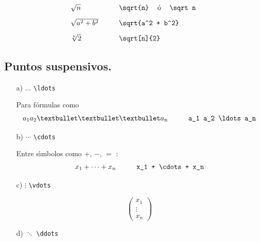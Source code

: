 $$
\begin{array}{l@{\hspace{1cm}}l}
\sqrt n & \verb+\sqrt{n}+ \mbox{\hspace{.3cm} {\'o} \hspace{.3cm}} \verb+\sqrt n+\\[.3cm]
\sqrt{a^2 + b^2} & 
\verb-\sqrt{a^2 + b^2}-
\\[.3cm]
\sqrt[n]{2} & \verb+\sqrt[n]{2}+
\end{array}
$$

\subsection{Puntos suspensivos.}

\begin{enumerate}
\item[a)] \hspace{.5cm} $\ldots$ \hspace{1cm} \verb+\ldots+

Para f{\'o}rmulas como
$$
\begin{array}{l@{\hspace{1cm}}l}
a_1a_2\ldots a_n & \verb+a_1 a_2 \ldots a_n+ \\
\end{array} 
$$
\item[b)] \hspace{.5cm} $\cdots$ \hspace{1cm} \verb+\cdots+

Entre s\'{\i}mbolos como $+$, $-$, $=$ :
$$
\begin{array}{l@{\hspace{1cm}}l}
x_1+\cdots +x_n & \verb-x_1 + \cdots + x_n- \\
\end{array} 
$$

\item[c)] \hspace{.5cm} $\vdots$ \hspace{1cm} \verb+\vdots+

$$
 \left( \begin{array}{c}
x_1 \\
\vdots \\
x_n
\end{array} \right)
$$

\item[d)] \hspace{.5cm} $\ddots$ \hspace{1cm} \verb+\ddots+


\end{enumerate}
